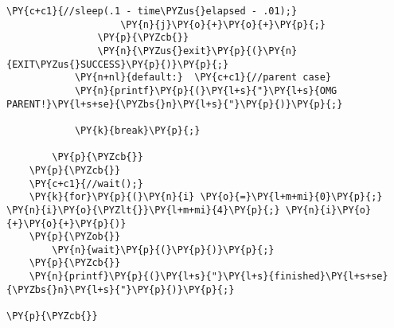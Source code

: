 \begin{Verbatim}[commandchars=\\\{\}]
                    \PY{c+c1}{//sleep(.1 - time\PYZus{}elapsed - .01);}
                    \PY{n}{j}\PY{o}{+}\PY{o}{+}\PY{p}{;}
                \PY{p}{\PYZcb{}}
                \PY{n}{\PYZus{}exit}\PY{p}{(}\PY{n}{EXIT\PYZus{}SUCCESS}\PY{p}{)}\PY{p}{;}
            \PY{n+nl}{default:}  \PY{c+c1}{//parent case}
            \PY{n}{printf}\PY{p}{(}\PY{l+s}{"}\PY{l+s}{OMG PARENT!}\PY{l+s+se}{\PYZbs{}n}\PY{l+s}{"}\PY{p}{)}\PY{p}{;}

            \PY{k}{break}\PY{p}{;}

        \PY{p}{\PYZcb{}}
    \PY{p}{\PYZcb{}}
    \PY{c+c1}{//wait();}
    \PY{k}{for}\PY{p}{(}\PY{n}{i} \PY{o}{=}\PY{l+m+mi}{0}\PY{p}{;} \PY{n}{i}\PY{o}{\PYZlt{}}\PY{l+m+mi}{4}\PY{p}{;} \PY{n}{i}\PY{o}{+}\PY{o}{+}\PY{p}{)}
    \PY{p}{\PYZob{}}
        \PY{n}{wait}\PY{p}{(}\PY{p}{)}\PY{p}{;}
    \PY{p}{\PYZcb{}}
    \PY{n}{printf}\PY{p}{(}\PY{l+s}{"}\PY{l+s}{finished}\PY{l+s+se}{\PYZbs{}n}\PY{l+s}{"}\PY{p}{)}\PY{p}{;}

\PY{p}{\PYZcb{}}
\end{Verbatim}
